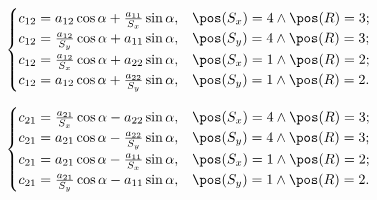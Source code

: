 $$\begin{cases}
	c_{12} = a_{12} \cos\alpha + \frac{a_{11}}{S_x} \sin\alpha, & \pos(S_x)=4 \wedge \pos(R)=3;\\
	c_{12} = \frac{a_{12}}{S_y} \cos\alpha + a_{11} \sin\alpha, & \pos(S_y)=4 \wedge \pos(R)=3;\\
	c_{12} = \frac{a_{12}}{S_x} \cos\alpha + a_{22} \sin\alpha, & \pos(S_x)=1 \wedge \pos(R)=2;\\
	c_{12} = a_{12} \cos\alpha + \frac{a_{22}}{S_y} \sin\alpha, & \pos(S_y)=1 \wedge \pos(R)=2.
\end{cases}$$

$$\begin{cases}
	c_{21} = \frac{a_{21}}{S_x} \cos\alpha - a_{22} \sin\alpha, & \pos(S_x)=4 \wedge \pos(R)=3;\\
	c_{21} = a_{21} \cos\alpha - \frac{a_{22}}{S_y} \sin\alpha, & \pos(S_y)=4 \wedge \pos(R)=3;\\
	c_{21} = a_{21} \cos\alpha - \frac{a_{11}}{S_x} \sin\alpha, & \pos(S_x)=1 \wedge \pos(R)=2;\\
	c_{21} = \frac{a_{21}}{S_y} \cos\alpha - a_{11} \sin\alpha, & \pos(S_y)=1 \wedge \pos(R)=2.
\end{cases}$$


